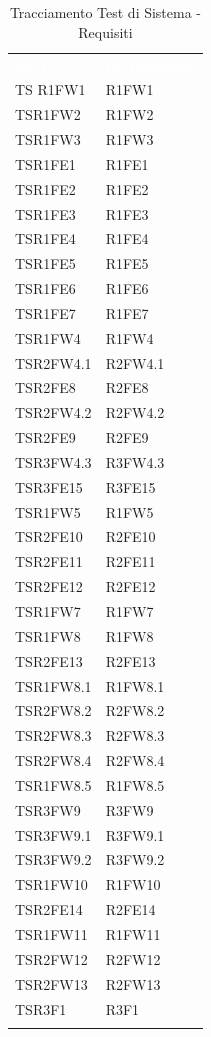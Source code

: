 \renewcommand{\arraystretch}{1.5}
\begin{longtable}{ m{}<{\centering}  m{}<{\centering} }
	\rowcolor{darkblue}
	\textcolor{white}{\textbf{ID Test}} &\textcolor{white}{\textbf{ID Requisito}}\\ 
	 
	TS	R1FW1 & R1FW1 \\
	TSR1FW2 &  R1FW2 \\
	TSR1FW3 & R1FW3 \\
	TSR1FE1 & R1FE1 \\
	TSR1FE2 & R1FE2 \\
	TSR1FE3 & R1FE3 \\
	TSR1FE4 & R1FE4 \\
	TSR1FE5 & R1FE5 \\
	TSR1FE6 & R1FE6 \\
	TSR1FE7 & R1FE7 \\
	TSR1FW4 & R1FW4 \\
	TSR2FW4.1 & R2FW4.1 \\
	TSR2FE8 & R2FE8 \\
	TSR2FW4.2 & R2FW4.2 \\
	TSR2FE9 & R2FE9 \\
	TSR3FW4.3 & R3FW4.3\\
	TSR3FE15 & R3FE15 \\
	TSR1FW5 & R1FW5 \\
	TSR2FE10 & R2FE10 \\	 
	TSR2FE11 & R2FE11 \\
	TSR2FE12 & R2FE12 \\
	TSR1FW7 & R1FW7 \\
	TSR1FW8 & R1FW8 \\
	TSR2FE13 & R2FE13 \\
	TSR1FW8.1 & R1FW8.1 \\
	TSR2FW8.2 & R2FW8.2 \\
	TSR2FW8.3 & R2FW8.3 \\
	TSR2FW8.4 & R2FW8.4 \\
	TSR1FW8.5 & R1FW8.5 \\
	TSR3FW9 & R3FW9 \\
	TSR3FW9.1 & R3FW9.1 \\
	TSR3FW9.2 & R3FW9.2 \\
	TSR1FW10 & R1FW10 \\
	TSR2FE14 & R2FE14  \\
	TSR1FW11 & R1FW11 \\
	TSR2FW12 & R2FW12 \\
	TSR2FW13 & R2FW13 \\
	TSR3F1 & R3F1 \\

\caption{Tracciamento Test di Sistema - Requisiti}
\end{longtable}


